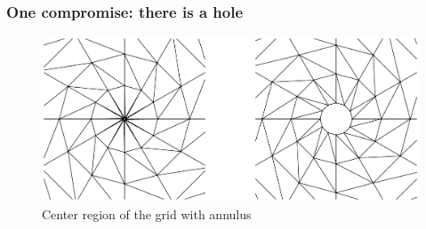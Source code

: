 \documentclass{beamer}
\begin{document}
\begin{frame}
\frametitle{One compromise: there is a hole}
\vspace{-1cm}
		\begin{center}
			\begin{figure}
				\includegraphics[trim={1cm 2cm 1cm 1cm},clip,width=1\textwidth]{FIGURES/Comparison_smin_annulus.eps}
				\caption{Center region of the grid with annulus}
			\end{figure}
		\end{center}
\end{frame}
\end{document}

